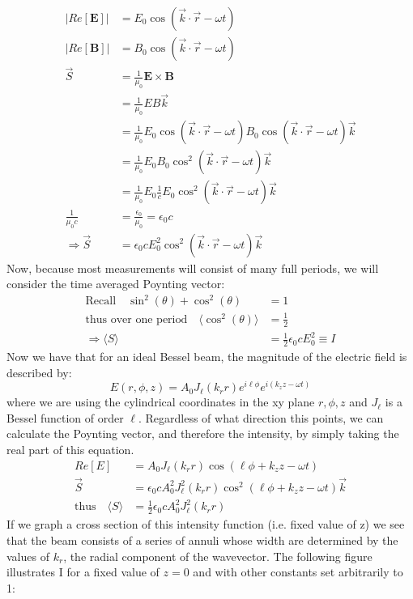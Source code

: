 \documentclass[a4paper, 11pt]{article}
\begin{document}
	\begin{align*}
		|Re[\mathbf{E}]| &= E_0\cos(\vec{k}\cdot\vec{r}-\omega t) \\ 
		|Re[\mathbf{B}]| &= B_0\cos(\vec{k}\cdot\vec{r}-\omega t) \\ 
		\vec{S} &= \frac{1}{\mu_0}\mathbf{E} \times \mathbf{B} \\ 		
		&= \frac{1}{\mu_0}EB\vec{k} \\ 
		&= \frac{1}{\mu_0}E_0\cos(\vec{k}\cdot\vec{r}-\omega t)B_0\cos(\vec{k}\cdot\vec{r}-\omega t)\vec{k} \\ 
		&= \frac{1}{\mu_0}E_0B_0\cos^2(\vec{k}\cdot\vec{r}-\omega t)\vec{k} \\
		&= \frac{1}{\mu_0}E_0\frac{1}{c}E_0\cos^2(\vec{k}\cdot\vec{r}-\omega t)\vec{k} \\
		\frac{1}{\mu_0c} &= \frac{\epsilon_0}{\mu_0}=\epsilon_0c \\ 
		\Rightarrow \vec{S} &= \epsilon_0cE_0^2\cos^2(\vec{k}\cdot\vec{r}-\omega t)\vec{k}  
	\end{align*}
Now, because most measurements will consist of many full periods, we will consider the time averaged Poynting vector: 
	\begin{align*}
		\text{Recall} \quad \sin^2(\theta)+\cos^2(\theta) &=1 \\ 
		\text{thus over one period} \quad \langle \cos^2(\theta)\rangle &= \frac{1}{2} \\
		\Rightarrow \langle S \rangle &= \frac{1}{2}\epsilon_0 cE_0^2 \equiv I 
	\end{align*}	
Now we have that for an ideal Bessel beam, the magnitude of the electric field is described by: 
	\begin{equation*}
		E(r,\phi,z) = A_0J_\ell(k_r r)e^{i\ell\phi}e^{i(k_z z-\omega t)}
	\end{equation*}
where we are using the cylindrical coordinates in the xy plane $r,\phi,z$ and $J_\ell$ is a Bessel function of order $\ell$. Regardless of what direction this points, we can calculate the Poynting vector, and therefore the intensity, by simply taking the real part of this equation. 
	\begin{align*}
		Re[E] 	&= A_0J_\ell(k_r r)\cos(\ell\phi + k_zz-\omega t)\\
		\vec{S} &= \epsilon_0cA_0^2J_\ell^2(k_r r)\cos^2(\ell\phi + k_zz-\omega t)\vec{k} \\
		\text{thus} \quad \langle S \rangle &= \frac{1}{2}\epsilon_0cA_0^2J_\ell^2(k_r r)
	\end{align*}
If we graph a cross section of this intensity function (i.e. fixed value of z) we see that the beam consists of a series of annuli whose width are determined by the values of $k_r$, the radial component of the wavevector. The following figure illustrates I for a fixed value of $z=0$ and with other constants set arbitrarily to 1: 
\end{document}
